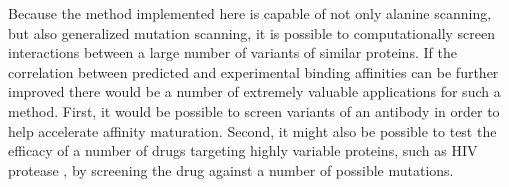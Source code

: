 Because the method implemented here is capable of not only alanine scanning, but also generalized mutation scanning, it is possible to computationally screen interactions between a large number of variants of similar proteins.
If the correlation between predicted and experimental binding affinities can be further improved there would be a number of extremely valuable applications for such a method.
First, it would be possible to screen variants of an antibody in order to help accelerate affinity maturation.
Second, it might also be possible to test the efficacy of a number of drugs targeting highly variable proteins, such as HIV protease \cite{watkins2003selection}, by screening the drug against a number of possible mutations.

